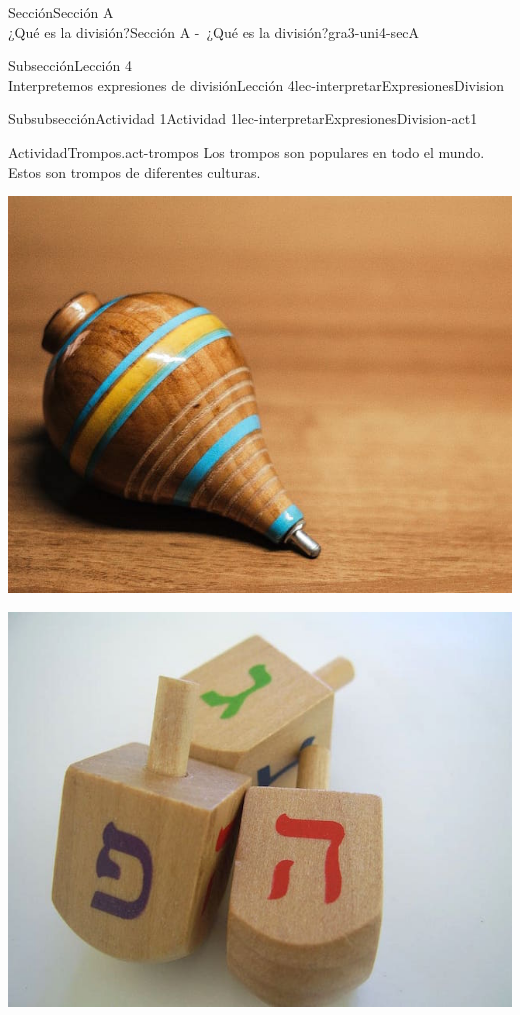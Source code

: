 \begin{sectionptx}{Sección}{{\Large Sección A\\}¿Qué es la división?}{}{Sección A -~¿Qué es la división?}{}{}{gra3-uni4-secA}
\begin{subsectionptx}{Subsección}{{\normalsize Lección 4\\[-0.05cm]}Interpretemos expresiones de división}{}{Lección 4}{}{}{lec-interpretarExpresionesDivision}
\begin{subsubsectionptx}{Subsubsección}{Actividad 1}{}{Actividad 1}{}{}{lec-interpretarExpresionesDivision-act1}
\begin{activity}{Actividad}{Trompos.}{act-trompos}%
Los trompos son populares en todo el mundo. Estos son trompos de diferentes culturas.%
\begin{sidebyside}{5}{0}{0}{0}%
\begin{sbspanel}{0.2}%
\includegraphics[max width=\linewidth, center]{external/jpg-source/V1 3.4.A.4 Mexican Trompo.jpg}
\end{sbspanel}%
\begin{sbspanel}{0.2}%
\includegraphics[max width=\linewidth, center]{external/jpg-source/V1 3.4.A.4 Dreidels.jpg}
\end{sbspanel}%

\end{sidebyside}
\end{activity}
\end{subsubsectionptx}
\end{subsectionptx}
\end{sectionptx}
